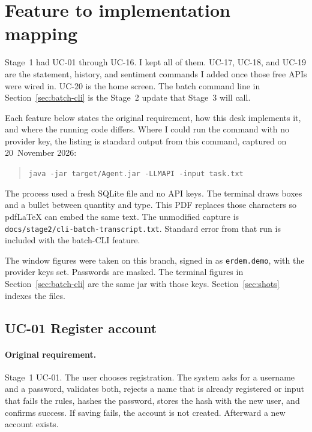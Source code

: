 \documentclass[11pt]{article}
\begin{document}
\section{Feature to implementation mapping}
\label{sec:features}

Stage~1 had UC-01 through UC-16. I kept all of them. UC-17, UC-18, and UC-19 are the statement, history, and sentiment commands I added once those free APIs were wired in. UC-20 is the home screen. The batch command line in Section~\ref{sec:batch-cli} is the Stage~2 update that Stage~3 will call.

Each feature below states the original requirement, how this desk implements it, and where the running code differs. Where I could run the command with no provider key, the listing is standard output from this command, captured on 20~November 2026:

\begin{quote}
\texttt{java -jar target/Agent.jar -LLMAPI -input task.txt}
\end{quote}

The process used a fresh SQLite file and no API keys. The terminal draws boxes and a bullet between quantity and type. This PDF replaces those characters so pdfLaTeX can embed the same text. The unmodified capture is \texttt{docs/stage2/cli-batch-transcript.txt}. Standard error from that run is included with the batch-CLI feature.

The window figures were taken on this branch, signed in as \texttt{erdem.demo}, with the provider keys set. Passwords are masked. The terminal figures in Section~\ref{sec:batch-cli} are the same jar with those keys. Section~\ref{sec:shots} indexes the files.

\subsection{UC-01 Register account}
\label{uc01}

\paragraph{Original requirement.}
Stage~1 UC-01. The user chooses registration. The system asks for a username and a password, validates both, rejects a name that is already registered or input that fails the rules, hashes the password, stores the hash with the new user, and confirms success. If saving fails, the account is not created. Afterward a new account exists.
\end{document}

